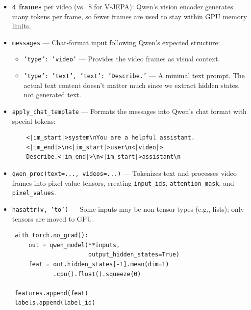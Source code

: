 \begin{explanation}
\begin{itemize}[nosep]
  \item \textbf{4 frames} per video (vs.\ 8 for V-JEPA): Qwen's vision encoder generates many tokens per frame, so fewer frames are used to stay within GPU memory limits.
  \item \texttt{messages} --- Chat-format input following Qwen's expected structure:
  \begin{itemize}[nosep]
    \item \texttt{'type': 'video'} --- Provides the video frames as visual context.
    \item \texttt{'type': 'text', 'text': 'Describe.'} --- A minimal text prompt. The actual text content doesn't matter much since we extract hidden states, not generated text.
  \end{itemize}
  \item \texttt{apply\_chat\_template} --- Formats the messages into Qwen's chat format with special tokens:
  \begin{verbatim}
    <|im_start|>system\nYou are a helpful assistant.
    <|im_end|>\n<|im_start|>user\n<|video|>
    Describe.<|im_end|>\n<|im_start|>assistant\n
  \end{verbatim}
  \item \texttt{qwen\_proc(text=..., videos=...)} --- Tokenizes text and processes video frames into pixel value tensors, creating \texttt{input\_ids}, \texttt{attention\_mask}, and \texttt{pixel\_values}.
  \item \texttt{hasattr(v, 'to')} --- Some inputs may be non-tensor types (e.g., lists); only tensors are moved to GPU.
\end{itemize}
\end{explanation}

\begin{lstlisting}
    with torch.no_grad():
        out = qwen_model(**inputs,
                         output_hidden_states=True)
        feat = out.hidden_states[-1].mean(dim=1)
               .cpu().float().squeeze(0)

    features.append(feat)
    labels.append(label_id)
\end{lstlisting}

